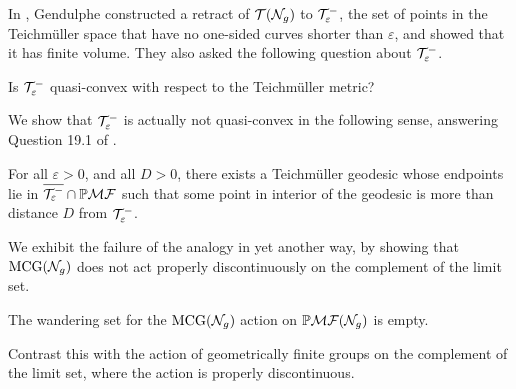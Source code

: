 \documentclass[12pt, reqno]{amsart}
\begin{document}
In \cite{gendulphe_whats_2017}, Gendulphe constructed a retract of $\mathcal{T}(\mathcal{N}_g)$ to $\mathcal{T}_{\varepsilon}^{-}$, the set of points in the Teichm\"uller space that have no one-sided curves shorter than $\varepsilon$, and showed that it has finite volume.
They also asked the following question about $\mathcal{T}_{\varepsilon}^{-}$.
\begin{unquestion}
  Is $\mathcal{T}_{\varepsilon}^{-}$ quasi-convex with respect to the Teichmüller metric?
\end{unquestion}
We show that $\mathcal{T}_{\varepsilon}^{-}$ is actually not quasi-convex in the following sense, answering Question 19.1 of \cite{gendulphe_whats_2017}.
\begingroup
\def\thetheorem{\ref{thm:qc-fail}}
\begin{theorem}
  For all $\varepsilon > 0$, and all $D > 0$, there exists a Teichm\"uller geodesic whose endpoints lie in $\overline{\mathcal{T}_{\varepsilon}^{-}} \cap \mathbb{P}\mathcal{MF}$ such that some point in interior of the geodesic is more than distance $D$ from $\mathcal{T}_{\varepsilon}^{-}$.
\end{theorem}
\addtocounter{theorem}{-1}
\endgroup
We exhibit the failure of the analogy in yet another way, by showing that $\mathrm{MCG}(\mathcal{N}_g)$ does not act properly discontinuously on the complement of the limit set.
\begingroup
\def\thetheorem{\ref{thm:dod-is-empty}}
\begin{theorem}
  The wandering set for the $\mathrm{MCG}(\mathcal{N}_g)$ action on $\mathbb{P}\mathcal{MF}(\mathcal{N}_g)$ is empty.
\end{theorem}
\addtocounter{theorem}{-1}
\endgroup
Contrast this with the action of geometrically finite groups on the complement of the limit set, where the action is properly discontinuous.
\end{document}
